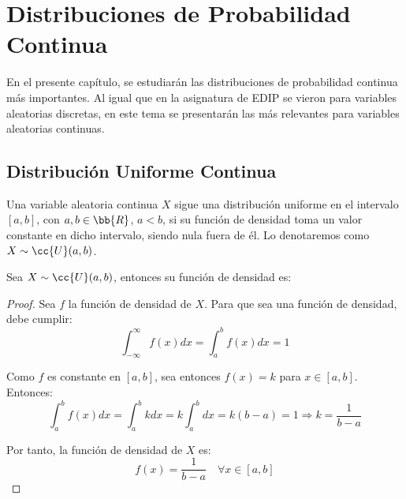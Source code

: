 \chapter{Distribuciones de Probabilidad Continua}

En el presente capítulo, se estudiarán las distribuciones de probabilidad continua más importantes. Al igual que 
en la asignatura de EDIP se vieron para variables aleatorias discretas, en este tema se presentarán las más
relevantes para variables aleatorias continuas.

\section{Distribución Uniforme Continua}

\begin{definicion}
    Una variable aleatoria continua $X$ sigue una distribución uniforme en el intervalo $[a,b]$, con $a,b\in \bb{R}$, $a<b$, si su función de densidad
    toma un valor constante en dicho intervalo, siendo nula fuera de él.
    Lo denotaremos como $X\sim \cc{U}(a,b)$.
\end{definicion}

\begin{prop}
    Sea $X\sim \cc{U}(a,b)$, entonces su función de densidad es:
\end{prop}
\begin{proof}
    Sea $f$ la función de densidad de $X$. Para que sea una función de densidad, debe cumplir:
    \begin{equation*}
        \int_{-\infty}^{\infty} f(x)dx = \int_{a}^{b} f(x)dx = 1
    \end{equation*}

    Como $f$ es constante en $[a,b]$, sea entonces $f(x) = k$ para $x\in [a,b]$. Entonces:
    \begin{equation*}
        \int_{a}^{b} f(x)dx =
        \int_{a}^{b} kdx = k\int_{a}^{b} dx = k(b-a) = 1 \Longrightarrow k = \frac{1}{b-a}
    \end{equation*}

    Por tanto, la función de densidad de $X$ es:
    \begin{equation*}
        f(x) = \frac{1}{b-a} \quad \forall x\in [a,b]
    \end{equation*}
\end{proof}

